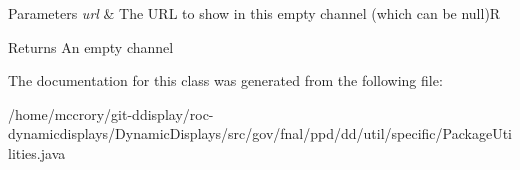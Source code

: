 \begin{DoxyParams}{Parameters}
{\em url} & The U\-R\-L to show in this empty channel (which can be null)R \\
\hline
\end{DoxyParams}
\begin{DoxyReturn}{Returns}
An empty channel 
\end{DoxyReturn}


The documentation for this class was generated from the following file\-:\begin{DoxyCompactItemize}
\item 
/home/mccrory/git-\/ddisplay/roc-\/dynamicdisplays/\-Dynamic\-Displays/src/gov/fnal/ppd/dd/util/specific/Package\-Utilities.\-java\end{DoxyCompactItemize}

